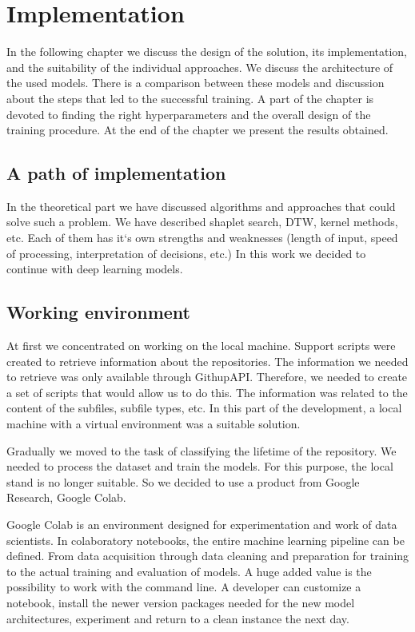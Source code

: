 \documentclass[thesis=M,english]{FITthesis}[2019/12/23]
\begin{document}
\chapter{Implementation}
\label{label:Implementation}
In the following chapter we discuss the design of the solution, its implementation, and the suitability of the individual approaches. We discuss the architecture of the used models. There is a comparison between these models and discussion  about the steps that led to the successful training. A part of the chapter is devoted to finding the right hyperparameters and the overall design of the training procedure. At the end of the chapter we present the results obtained.

\section{A path of implementation}
In the theoretical part we have discussed algorithms and approaches that could solve such a problem. We have described shaplet search, DTW, kernel methods, etc. Each of them has it`s own strengths and weaknesses (length of input, speed of processing, interpretation of decisions, etc.) In this work we decided to continue with deep learning models. 
\section{Working environment}

At first we concentrated on working on the local machine. Support scripts were created to retrieve information about the repositories. The information we needed to retrieve was only available through GithupAPI. Therefore, we needed to create a set of scripts that would allow us to do this. The information was related to the content of the subfiles, subfile types, etc. 
In this part of the development, a local machine with a virtual environment was a suitable solution.

Gradually we moved to the task of classifying the lifetime of the repository. We needed to process the dataset and train the models. For this purpose, the local stand is no longer suitable. So we decided to use a product from Google Research, Google Colab.

Google Colab is an environment designed for experimentation and work of data scientists. In colaboratory notebooks, the entire machine learning pipeline can be defined. From data acquisition through data cleaning and preparation for training to the actual training and evaluation of models. A huge added value is the possibility to work with the command line. A developer can customize a notebook, install the newer version packages needed for the new model architectures, experiment and return to a clean instance the next day.
\end{document}
